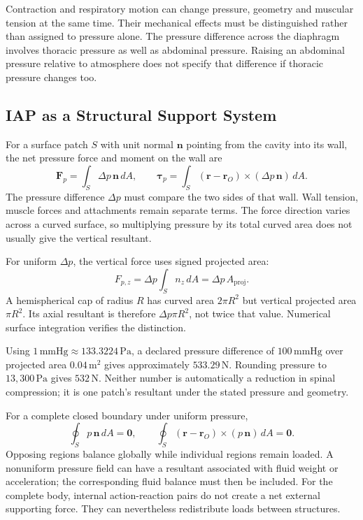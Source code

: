 Contraction and respiratory motion can change pressure, geometry and muscular tension at the same time. Their mechanical effects must be distinguished rather than assigned to pressure alone. The pressure difference across the diaphragm involves thoracic pressure as well as abdominal pressure. Raising an abdominal pressure relative to atmosphere does not specify that difference if thoracic pressure changes too.

\subsection{IAP as a Structural Support System}

For a surface patch $S$ with unit normal $\mathbf n$ pointing from the cavity into its wall, the net pressure force and moment on the wall are
\[
\mathbf F_p=\int_S\Delta p\,\mathbf n\,dA,\qquad
\boldsymbol\tau_p=\int_S(\mathbf r-\mathbf r_O)
\times(\Delta p\,\mathbf n)\,dA.
\]
The pressure difference $\Delta p$ must compare the two sides of that wall. Wall tension, muscle forces and attachments remain separate terms. The force direction varies across a curved surface, so multiplying pressure by its total curved area does not usually give the vertical resultant.

For uniform $\Delta p$, the vertical force uses signed projected area:
\[
F_{p,z}=\Delta p\int_S n_z\,dA
=\Delta p\,A_{\mathrm{proj}}.
\]
A hemispherical cap of radius $R$ has curved area $2\pi R^2$ but vertical projected area $\pi R^2$. Its axial resultant is therefore $\Delta p\pi R^2$, not twice that value. Numerical surface integration verifies the distinction.

Using $1\,\mathrm{mmHg}\approx133.3224\,\mathrm{Pa}$, a declared pressure difference of $100\,\mathrm{mmHg}$ over projected area $0.04\,\mathrm{m^2}$ gives approximately $533.29\,\mathrm N$. Rounding pressure to $13{,}300\,\mathrm{Pa}$ gives $532\,\mathrm N$. Neither number is automatically a reduction in spinal compression; it is one patch's resultant under the stated pressure and geometry.

For a complete closed boundary under uniform pressure,
\[
\oint_S p\,\mathbf n\,dA=\mathbf0,\qquad
\oint_S(\mathbf r-\mathbf r_O)\times(p\,\mathbf n)\,dA=\mathbf0.
\]
Opposing regions balance globally while individual regions remain loaded. A nonuniform pressure field can have a resultant associated with fluid weight or acceleration; the corresponding fluid balance must then be included. For the complete body, internal action-reaction pairs do not create a net external supporting force. They can nevertheless redistribute loads between structures.

